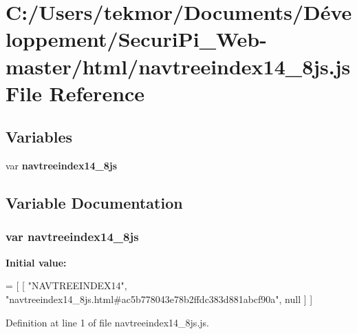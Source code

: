 \section{C\+:/\+Users/tekmor/\+Documents/\+Développement/\+Securi\+Pi\+\_\+\+Web-\/master/html/navtreeindex14\+\_\+8js.js File Reference}
\label{navtreeindex14__8js_8js}
\subsection*{Variables}
\begin{DoxyCompactItemize}
\item 
var {\bf navtreeindex14\+\_\+8js}
\end{DoxyCompactItemize}


\subsection{Variable Documentation}
\subsubsection[{navtreeindex14\+\_\+8js}]{\setlength{\rightskip}{0pt plus 5cm}var navtreeindex14\+\_\+8js}\label{navtreeindex14__8js_8js_abf3b029d2351c251cef45712910594c3}
{\bfseries Initial value\+:}
\begin{DoxyCode}
=
[
    [ \textcolor{stringliteral}{"NAVTREEINDEX14"}, \textcolor{stringliteral}{"navtreeindex14\_8js.html#ac5b778043e78b2ffdc383d881abcf90a"}, null ]
]
\end{DoxyCode}


Definition at line 1 of file navtreeindex14\+\_\+8js.\+js.

